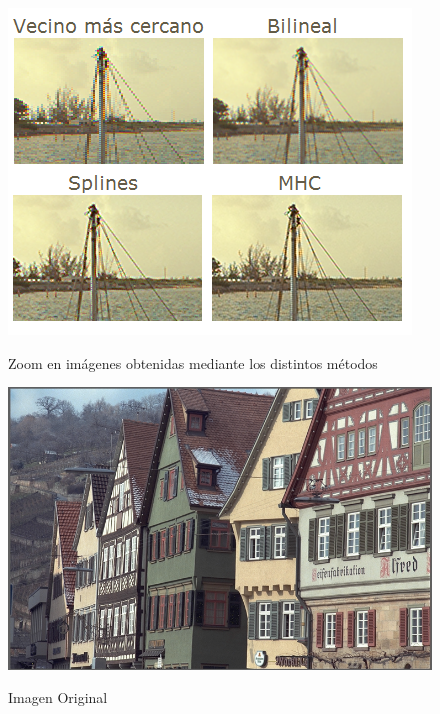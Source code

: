 \documentclass[a4paper]{article}
\begin{document}
\begin{figure}[h!]
    \caption{Zoom en imágenes obtenidas mediante los distintos métodos}
    \begin{center}
    \includegraphics[scale=1.2]{imagenes/comparacion/02/mastil}
    \label{mastil}
  \end{center}
\end{figure}

\newpage

\begin{figure}[h!]
    \caption{Imagen Original}
    \begin{center}
    \includegraphics[scale=0.15]{imagenes/comparacion/04/img4}
    \label{imagen4}
  \end{center}
\end{figure}
\end{document}
